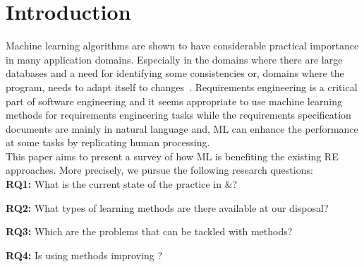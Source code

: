 \section{Introduction}

% 
% 
% 
% 
Machine learning algorithms are shown to have considerable practical importance in many application domains. Especially in the domains where there are large databases and a need for identifying some consistencies or, domains where the program, needs to adapt itself to changes~\cite{Zhang2002}. Requirements engineering is a critical part of software engineering and it seems appropriate to use machine learning methods for requirements engineering tasks while the requirements specification documents are mainly in natural language and, ML can enhance the performance at some tasks by replicating human processing. \\
This paper aims to present a survey of how ML is benefiting the existing RE approaches. More precisely, we pursue the following research questions: \\
\noindent
\textbf{RQ1:} What is the current state of the practice in \ML${\&}$\RE?

\noindent
\textbf{RQ2:} What types of learning methods are there available at our disposal?

\noindent
\textbf{RQ3:} Which are the \RE problems that can be tackled with \ML methods?

\noindent
\textbf{RQ4:} Is using \ML methods improving \RE?


